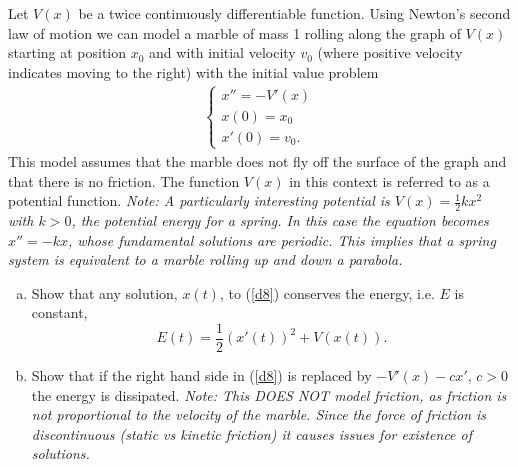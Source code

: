 \documentclass[12pt,letterpaper]{hmcpset}
\begin{document}
\begin{solution}
    \vfill
\end{solution}
\clearpage

\begin{problem}
     Let $V(x)$ be a twice continuously differentiable
     function. Using Newton’s second law of motion we
     can model a marble of mass 1 rolling along the graph
     of $V(x)$ starting at position $x_0$ and with initial
     velocity $v_0$ (where positive velocity indicates
     moving to the right) with the initial value problem
     \begin{align}
         \begin{cases}
            x'' = -V'(x)\\
            x(0)=x_0\\
            x'(0)=v_0.
         \end{cases}\label{d8}
     \end{align}
     This model assumes that the marble does not fly off 
     the surface of the graph and that there is no friction.
     The function $V(x)$ in this context is referred to as 
     a potential function. \textit{Note: A particularly 
     interesting potential is $V (x) = \frac{1}{2}kx^2$ with 
     $k > 0$, the potential energy for a spring. In this case the
     equation becomes $x'' = −kx$, whose fundamental solutions
     are periodic. This implies that a spring system is equivalent 
     to a marble rolling up and down a parabola.}
     \begin{enumerate}[(a)]
         \item Show that any solution, $x(t)$, to (\ref{d8})
             conserves the energy, i.e. $E$ is constant,
             \[
                 E(t) = \frac{1}{2}\left(x'(t)\right)^2 + V(x(t)).
             \]
         \item Show that if the right hand side in (\ref{d8}) is 
            replaced by $-V'(x)-cx'$, $c>0$ the energy is dissipated.
            \textit{Note: This DOES NOT model friction, as friction
            is not proportional to the velocity of the marble.
            Since the force of friction is discontinuous (static
            vs kinetic friction) it causes issues for existence 
            of solutions.}
     \end{enumerate}
\end{problem}

\begin{solution}
    \vfill
\end{solution}
\clearpage
\end{document}
